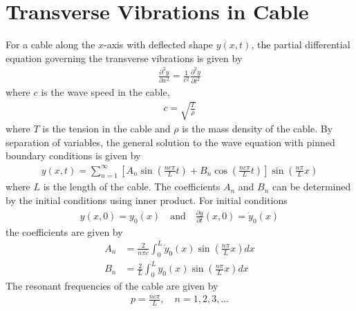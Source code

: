\section{Transverse Vibrations in Cable}
For a cable along the $x$-axis with deflected shape $y(x, t)$, the partial differential equation governing the transverse vibrations is given by
\begin{align*}
    \frac{\partial^2 y}{\partial x^2} = \frac{1}{c^2} \frac{\partial^2 y}{\partial t^2}
\end{align*}
where $c$ is the wave speed in the cable,
\begin{align*}
    c = \sqrt{\frac{T}{\rho}}
\end{align*}
where $T$ is the tension in the cable and $\rho$ is the mass density of the cable. By separation of variables, the general solution to the wave equation with pinned boundary conditions is given by
\begin{align*}
    y(x, t) = \sum_{n = 1}^{\infty} \left[A_n \sin\left(\frac{n c \pi}{L} t\right) + B_n \cos\left(\frac{n c \pi}{L} t\right)\right] \sin\left(\frac{n \pi}{L} x\right)
\end{align*}
where $L$ is the length of the cable. The coefficients $A_n$ and $B_n$ can be determined by the initial conditions using inner product. For initial conditions
\begin{align*}
    y(x, 0) = y_0(x) \quad \text{and} \quad \frac{\partial y}{\partial t}(x, 0) = \dot{y}_0(x)
\end{align*}
the coefficients are given by
\begin{align*}
    A_n &= \frac{2}{n \pi c} \int_0^L \dot{y}_0(x) \sin\left(\frac{n \pi}{L} x\right) dx \\
    B_n &= \frac{2}{L} \int_0^L y_0(x) \sin\left(\frac{n \pi}{L} x\right) dx
\end{align*}
The resonant frequencies of the cable are given by
\begin{align*}
    p = \frac{n c \pi}{L}, \quad n = 1, 2, 3, \ldots
\end{align*}
